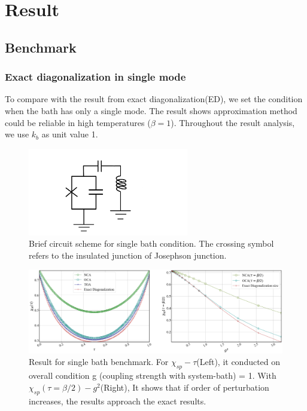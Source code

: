 \documentclass{article}[12pt]
\begin{document}
\section{Result}
\begin{spacing}{1.5}
\subsection{Benchmark}
\subsubsection*{Exact diagonalization in single mode}
To compare with the result from exact diagonalization(ED), we set the condition when the bath has only a single mode. 
The result shows approximation method could be reliable in high temperatures ($\beta = 1$). Throughout the result analysis, we use $k_b$ as unit value 1.
\begin{figure}[htbp]
  \centerline{\includegraphics[width=7cm]{TexFigure/kps_singlebath.png}}
  \caption{Brief circuit scheme for single bath condition. The crossing symbol  refers to the insulated junction of Josephson junction.}
\end{figure}
\begin{figure}[htbp]
  \centerline{\includegraphics[width=15cm]{TexFigure/bench_single_two.png}}
  \caption{Result for single bath benchmark. For $\chi_{sp} - \tau$(Left), it conducted on overall condition g (coupling strength with system-bath) = 1.
  With $\chi_{sp}(\tau=\beta/2)-g^2$(Right), It shows that if order of perturbation increases, the results approach the exact results.}
\end{figure}

\end{spacing}
\end{document}
